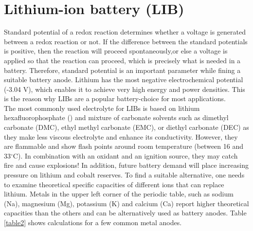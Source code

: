 \section{Lithium-ion battery (LIB)}
Standard potential of a redox reaction determines whether a voltage is generated between a redox reaction or not. If the difference between the standard potentials is positive, then the reaction will proceed spontaneously,or else a voltage is applied so that the reaction can proceed, which is precisely what is needed in a battery. Therefore, standard potential is an important parameter while fining a suitable battery anode\cite{liu_understanding_2016}. Lithium has the most negative electrochemical potential (-3.04 V), which enables it to achieve very high energy and power densities. This is the reason why LIBs are a popular battery-choice for most applications.\\
The most commonly used electrolyte for LIBs is based on lithium hexafluorophosphate () and mixture of carbonate solvents such as dimethyl carbonate (DMC), ethyl methyl carbonate (EMC), or diethyl carbonate (DEC) as they make less viscous electrolyte and enhance its conductivity. However, they are flammable and show flash points around room temperature (between 16 and 33$^{\circ}$C). In combination with an oxidant and an ignition source, they may catch fire and cause explosions! In addition, future battery demand will place increasing pressure on lithium and cobalt reserves\cite{turcheniuk_ten_2018}. To find a suitable alternative, one needs to examine theoretical specific capacities of different ions that can replace lithium. Metals in the upper left corner of the periodic table, such as sodium (Na), magnesium (Mg), potassium (K) and calcium (Ca) report higher theoretical capacities than the others and can be alternatively used as battery anodes. Table  \ref{table2} shows calculations for a few common metal anodes. 

